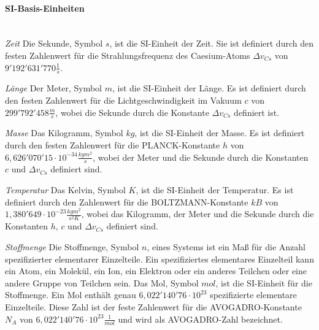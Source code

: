 \noindent
\paragraph{SI-Basis-Einheiten}\mbox{}\\
\textit{Zeit}\linebreak
Die Sekunde, Symbol $s$, ist die SI-Einheit der Zeit.
Sie ist definiert durch den festen Zahlenwert für die Strahlungsfrequenz
des Caesium-Atoms $\Delta{v_{Cs}}$ von $9'192'631'770\frac{1}{s}$.
\vspace{1mm}

\textit{Länge}\linebreak
Der Meter, Symbol $m$, ist die SI-Einheit der Länge. Es ist definiert durch
den festen Zahlenwert für die Lichtgeschwindigkeit im Vakuum $c$ von
$299'792'458\frac{m}{s}$, wobei die Sekunde durch die Konstante $\Delta{v_{Cs}}$
definiert ist.
\vspace{1mm}

\textit{Masse}\linebreak
Das Kilogramm, Symbol $kg$, ist die SI-Einheit der Masse. Es ist definiert durch
den festen Zahlenwert für die PLANCK-Konstante $h$ von
$6,626'070'15 \cdot 10^{-34}\frac{kgm^2}{s}$, wobei der Meter und die Sekunde
durch die Konstanten $c$ und $\Delta{v_{Cs}}$ definiert sind.
\vspace{1mm}

\textit{Temperatur}\linebreak
Das Kelvin, Symbol $K$, ist die SI-Einheit der Temperatur.
Es ist definiert durch den Zahlenwert für die BOLTZMANN-Konstante $kB$
von $1,380'649\cdot10^{-23}\frac{kgm^2}{s^2K}$, wobei das Kilogramm, der Meter
und die Sekunde durch die Konstanten $h$, $c$ und $\Delta{v_{Cs}}$ definiert sind.
\vspace{1mm}

\textit{Stoffmenge}\linebreak
Die Stoffmenge, Symbol $n$, eines Systems ist ein Maß für die Anzahl spezifizierter
elementarer Einzelteile. Ein spezifiziertes elementares Einzelteil kann ein Atom,
ein Molekül, ein Ion, ein Elektron oder ein anderes Teilchen oder eine andere Gruppe
von Teilchen sein. Das Mol, Symbol $mol$, ist die SI-Einheit für die Stoffmenge. Ein Mol
enthält genau $6,022'140'76\cdot10^{23}$ spezifizierte elementare Einzelteile.
Diese Zahl ist der feste Zahlenwert für die AVOGADRO-Konstante $N_A$
von $6,022'140'76\cdot10^{23}\frac{1}{mol}$ und wird als AVOGADRO-Zahl bezeichnet.
\vspace{1mm}

